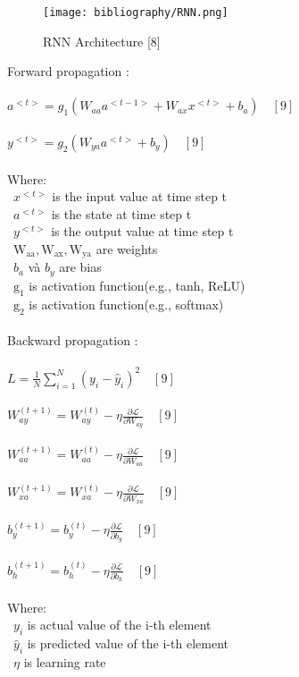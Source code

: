 \documentclass{ieeeojies}
\begin{document}
\begin{figure}[H]
  \centering
  \begin{minipage}{0.9\linewidth}
    \centering
    \texttt{[image: bibliography/RNN.png]}
    \caption{RNN Architecture [8]}
    \label{fig8}
  \end{minipage}
\end{figure}
\noindent Forward propagation :\\
\\$
a^{<t>}=g_1\left(W_{a a} a^{<t-1>}+W_{a x} x^{<t>}+b_a\right)\quad [9]
$\\
\\$
y^{<t>}=g_2\left(W_{y a} a^{<t>}+b_y\right)\quad [9]
$\\
\\Where:\\
\indent\textbullet\ $x^{<t>}$ is the input value at time step t\\
\indent\textbullet\ $a^{<t>}$ is the state at time step t\\
\indent\textbullet\ $y^{<t>}$ is the output value at time step t\\
\indent\textbullet\ $\mathrm{W}_{\mathrm{aa}}, \mathrm{W}_{\mathrm{ax}}, \mathrm{W}_{\mathrm{ya}}$ are weights\\
\indent\textbullet\ $b_a$ và $b_y$ are bias\\
\indent\textbullet\ $\mathrm{g}_1$ is activation function(e.g., tanh, ReLU)\\
\indent\textbullet\ $\mathrm{g}_2$ is activation function(e.g., softmax)\\
\\\noindent Backward propagation :\\
\\$L = \frac{1}{N} \sum_{i=1}^{N} (y_i - \hat{y}_i)^2\quad [9]$\\
\\$W_{a y}^{(t+1)}=W_{a y}^{(t)}-\eta \frac{\partial \mathcal{L}}{\partial W_{a y}}\quad [9]$\\
\\$W_{a a}^{(t+1)}=W_{a a}^{(t)}-\eta \frac{\partial \mathcal{L}}{\partial W_{a a}}\quad [9]$\\
\\$W_{x a}^{(t+1)}=W_{x a}^{(t)}-\eta \frac{\partial \mathcal{L}}{\partial W_{x a}}\quad [9]$\\
\\$b_y^{(t+1)}=b_y^{(t)}-\eta \frac{\partial \mathcal{L}}{\partial b_y}\quad [9]$\\
\\$b_h^{(t+1)}=b_h^{(t)}-\eta \frac{\partial \mathcal{L}}{\partial b_h} \quad [9]$\\
\\Where:\\
\indent\textbullet\ $y_i$ is actual value of the i-th element\\
\indent\textbullet\ $\hat{y}_i$ is predicted value of the i-th element\\
\indent\textbullet\ $\eta$ is learning rate \\
\end{document}
